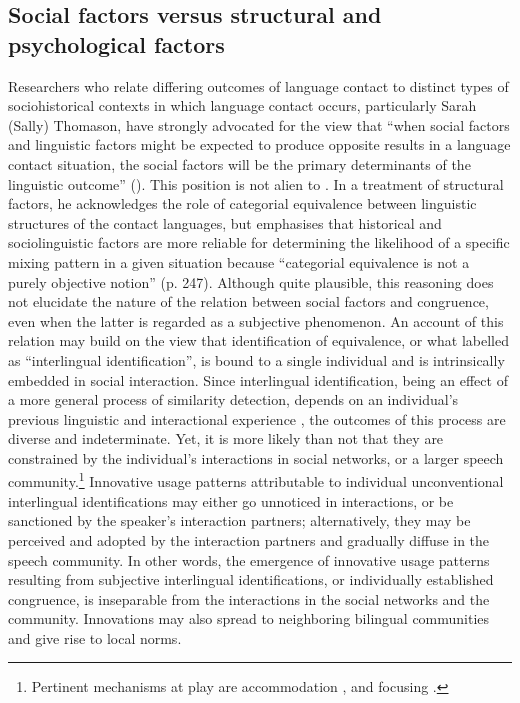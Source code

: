 \subsection{Social factors versus structural and psychological factors}{\label{social-factors}}
Researchers who relate differing outcomes of language contact to distinct types of sociohistorical contexts in which language contact occurs, particularly Sarah (Sally) Thomason, have strongly advocated for the view that ``when social factors and linguistic factors might be expected to produce opposite results in a language contact situation, the social factors will be the primary determinants of the linguistic outcome'' (\citeyear[][42]{thomason-08}). This position is not alien to \citet{muysken-bilingual-2000}. In a treatment of structural factors, he acknowledges the role of categorial equivalence between linguistic structures of the contact languages, but emphasises that historical and sociolinguistic factors are more reliable for determining the likelihood of a specific mixing pattern in a given situation because ``categorial equivalence is not a purely objective notion'' (p. 247). Although quite plausible, this reasoning does not elucidate the nature of the relation between social factors and congruence, even when the latter is regarded as a subjective phenomenon. An account of this relation may build on the view that identification of equivalence, or what \citet[][]{weinreich-53} labelled as ``interlingual identification'', is bound to a single individual \citep[see the discussion in][37]{gardner-chloros_code-switching_2009} and is intrinsically embedded in social interaction. Since interlingual identification, being an effect of a more general process of similarity detection, depends on an individual's previous linguistic and interactional experience \citep[for more details, see][]{hakimov-17,hakimov-backus-20-intro}, the outcomes of this process are diverse and indeterminate. Yet, it is more likely than not that they are constrained by the individual's interactions in social networks, or a larger speech community.\footnote{Pertinent mechanisms at play are accommodation \citep{giles-80}, and focusing \citep{lepage-tabouretkeller}.} Innovative usage patterns attributable to individual unconventional interlingual identifications may either go unnoticed in interactions, or be sanctioned by the speaker's interaction partners; alternatively, they may be perceived and adopted by the interaction partners and gradually diffuse in the speech community. In other words, the emergence of innovative usage patterns resulting from subjective interlingual identifications, or individually established congruence, is inseparable from the interactions in the social networks and the community. Innovations may also spread to neighboring bilingual communities and give rise to local norms.

